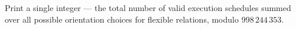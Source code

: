 Print a single integer --- the total number of valid execution schedules summed over all possible orientation choices for flexible relations, modulo $998\,244\,353$.